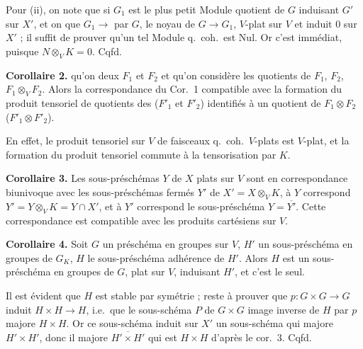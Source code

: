 \documentclass[11pt,a4paper]{article}
\begin{document}
Pour (ii), on note que si $G_1$ est le plus petit Module quotient de $G$
induisant $G'$ sur $X'$, \struck{\ill{}} et on  que
$G_1 \to$ 
 par $G$,  le noyau de
 $G \to G_1$, 
 $V$-plat sur $V$ et induit $0$ sur
$X'$ ; il suffit de prouver qu'un tel Module q.\ coh.\ est Nul. Or c'est
immédiat, puisque $N \otimes_V K = 0$. Cqfd.

\textbf{Corollaire 2.} \struck{\ill{}}  \ill{} qu'on
 deux $F_1$ et $F_2$  et qu'on considère les 
 quotients de $F_1$, $F_2$,
$F_1 \otimes_V F_2$. Alors la correspondance du Cor.~1 
compatible avec la formation du \struck{\ill{}} produit tensoriel de
quotients des   ($F'_1$ et $F'_2$) identifiés à un quotient de $F_1 \otimes F_2$
($F'_1 \otimes F'_2$).

En effet, le produit tensoriel sur $V$ de faisceaux q.\ coh.\ $V$-plats est
$V$-plat, et la \struck{\ill{}} formation du produit tensoriel commute à la
tensorisation par $K$.

\textbf{Corollaire 3.}  Les sous-préschémas
 $Y$ de $X$ plats sur $V$ sont en correspondance
biunivoque avec les sous-préschémas fermés $Y'$ de $X' = X \otimes_V K$,
à $Y$ correspond $Y' = Y \otimes_V K = Y \cap X'$, et à $Y'$ correspond le
sous-préschéma  $Y = \overline{Y'}$. Cette
correspondance est compatible avec les produits cartésiens sur $V$.

\textbf{Corollaire 4.} Soit $G$ un préschéma en groupes sur $V$, $H'$ un
sous-préschéma en groupes  de $G_K$, $H$ le
sous-préschéma adhérence de $H'$. Alors $H$ est un sous-préschéma en groupes
de $G$, plat sur $V$,  induisant $H'$, et c'est le seul.

Il est évident que $H$ est stable par symétrie ; reste à prouver que
$p \colon G \times G \to G$ induit $H \times H \to H$, i.e.\ que le
sous-schéma  $P$ de $G \times G$ image inverse de
$H$ par $p$ \struck{\ill{}} majore $H \times H$. Or ce sous-schéma induit
sur $X'$ un sous-schéma qui majore $H' \times H'$, donc il majore
$\overline{H' \times H'}$ qui est $H \times H$ d'après le cor.~3. Cqfd.
\end{document}
